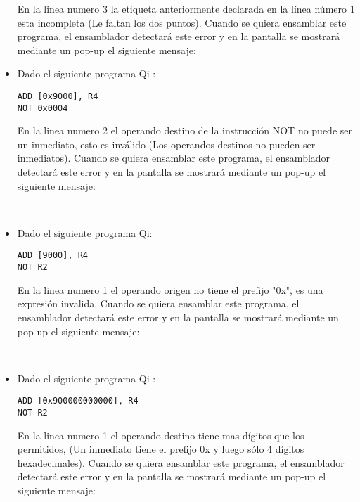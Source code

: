 \begin{itemize}
En la linea numero 3 la etiqueta anteriormente declarada en la línea número 1 esta incompleta (Le faltan los dos puntos). Cuando se quiera ensamblar este programa, el ensamblador detectará este error y en la pantalla se mostrará mediante un pop-up el siguiente mensaje:



\item Dado el siguiente programa Qi :\\

\begin{verbatim}
ADD [0x9000], R4
NOT 0x0004
\end{verbatim}

En la linea numero 2 el operando destino de la instrucción NOT no puede ser un inmediato, esto es inválido (Los operandos destinos no pueden ser inmediatos). Cuando se quiera ensamblar este programa, el ensamblador detectará este error y en la pantalla se mostrará mediante un pop-up el siguiente mensaje:

 \\ 

\item Dado el siguiente programa Qi:\\

\begin{verbatim}
ADD [9000], R4
NOT R2
\end{verbatim}

En la linea numero 1 el operando origen no tiene el prefijo "0x", es una expresión invalida. Cuando se quiera ensamblar este programa, el ensamblador detectará este error y en la pantalla se mostrará mediante un pop-up el siguiente mensaje:

 \\ 

\item Dado el siguiente programa Qi :\\

\begin{verbatim}
ADD [0x900000000000], R4
NOT R2
\end{verbatim}

En la linea numero 1 el operando destino tiene mas dígitos que los permitidos, (Un inmediato tiene el prefijo 0x y luego sólo 4 dígitos hexadecimales). Cuando se quiera ensamblar este programa, el ensamblador detectará este error y en la pantalla se mostrará mediante un pop-up el siguiente mensaje:


\end{itemize}
